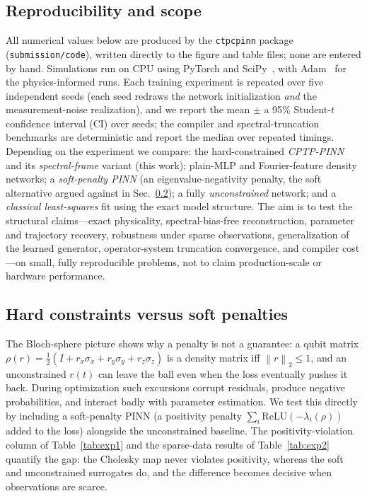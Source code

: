 \documentclass[11pt]{article}
\newcommand{\norm}[1]{\left\lVert #1 \right\rVert}
\begin{document}
\subsection{Reproducibility and scope}
\label{sec:experimental_scope}

All numerical values below are produced by the \texttt{ctpcpinn} package (\texttt{submission/code}), written directly to the figure and table files; none are entered by hand. Simulations run on CPU using PyTorch and SciPy~\cite{paszke2019pytorch,virtanen2020scipy}, with Adam~\cite{kingma2015adam} for the physics-informed runs. Each training experiment is repeated over five independent seeds (each seed redraws the network initialization \emph{and} the measurement-noise realization), and we report the mean $\pm$ a 95\% Student-$t$ confidence interval (CI) over seeds; the compiler and spectral-truncation benchmarks are deterministic and report the median over repeated timings. Depending on the experiment we compare: the hard-constrained \emph{CPTP-PINN} and its \emph{spectral-frame} variant (this work); plain-MLP and Fourier-feature density networks; a \emph{soft-penalty PINN} (an eigenvalue-negativity penalty, the soft alternative argued against in Sec.~\ref{sec:soft_penalties_results}); a fully \emph{unconstrained} network; and a \emph{classical least-squares} fit using the exact model structure. The aim is to test the structural claims---exact physicality, spectral-bias-free reconstruction, parameter and trajectory recovery, robustness under sparse observations, generalization of the learned generator, operator-system truncation convergence, and compiler cost---on small, fully reproducible problems, not to claim production-scale or hardware performance.

\subsection{Hard constraints versus soft penalties}
\label{sec:soft_penalties_results}

The Bloch-sphere picture shows why a penalty is not a guarantee: a qubit matrix $\rho(r)=\tfrac12(I+r_x\sigma_x+r_y\sigma_y+r_z\sigma_z)$ is a density matrix iff $\norm{r}_2\le1$, and an unconstrained $r(t)$ can leave the ball even when the loss eventually pushes it back. During optimization such excursions corrupt residuals, produce negative probabilities, and interact badly with parameter estimation. We test this directly by including a soft-penalty PINN (a positivity penalty $\sum_i\mathrm{ReLU}(-\lambda_i(\rho))$ added to the loss) alongside the unconstrained baseline. The positivity-violation column of Table~\ref{tab:exp1} and the sparse-data results of Table~\ref{tab:exp2} quantify the gap: the Cholesky map never violates positivity, whereas the soft and unconstrained surrogates do, and the difference becomes decisive when observations are scarce.
\end{document}
